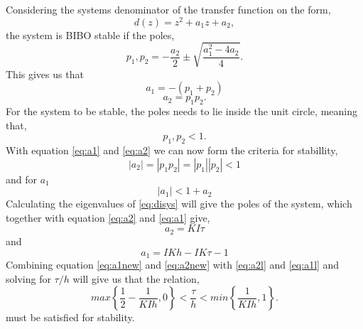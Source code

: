 \documentclass[12pt,a4paper]{article}
\begin{document}
\subsubsection{} %

Considering the systems denominator of the transfer function on the
form, 
\begin{equation}
    d(z) = z^2+a_1z+a_2,
\end{equation}
the system is BIBO stable if the poles,
\begin{equation}
  p_1,p_2=-\frac{a_2}{2}\pm \sqrt{\frac{a_1^2-4a_2}{4}}.
\end{equation}
This gives us that
\begin{equation}
    a_1=-(p_1+p_2)
    \label{eq:a1}
\end{equation}
\begin{equation}
    a_2=p_1p_2.
    \label{eq:a2}
\end{equation}
For the system to be stable, the poles needs to lie inside the unit
circle, meaning that,
\begin{equation}
    p_1, p_2 < 1.
\end{equation}
With equation \ref{eq:a1} and \ref{eq:a2} we can now form the criteria for stabillity,
\begin{equation}
    |a_2|=|p_1p_2|=|p_1||p_2|<1
    \label{eq:a2l}
\end{equation}
and for $a_1$
\begin{equation}
    |a_1|<1+a_2
    \label{eq:a1l}
\end{equation}
Calculating the eigenvalues of \ref{eq:disys} will give the poles of the
system, which together with equation \ref{eq:a2} and \ref{eq:a1} give,
\begin{equation}
  a_2 = KI\tau
  \label{eq:a2new}
\end{equation}
and
\begin{equation}
    a_1 = IKh-IK\tau-1
    \label{eq:a1new}
\end{equation}
Combining equation \ref{eq:a1new} and \ref{eq:a2new} with \ref{eq:a2l}
and \ref{eq:a1l} and solving for $\tau/h$ will give us that the
relation,
\begin{equation}
  max\left\{\frac{1}{2}-\frac{1}{KIh},0\right\}<\frac{\tau}{h}<min\left\{\frac{1}{KIh},1\right\}.
\end{equation}
must be satisfied for stability.


\end{document}
